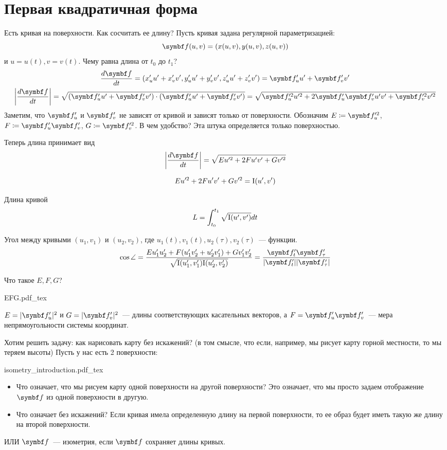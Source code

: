 \documentclass[main]{subfiles}
\begin{document}
\chapter{Первая квадратичная форма}
Есть кривая на поверхности. Как сосчитать ее длину?
Пусть кривая задана регулярной параметризацией:
\[\vf(u,v) = (x(u,v), y(u,v), z(u,v))\]
и $u = u(t), v = v(t)$.
Чему равна длина от $t_0$ до $t_1$?
\begin{gather*}
    \frac{d\vf}{dt} = (x_u' u' + x_v' v', y_u' u' + y_v' v', z_u' u' + z_v' v') = \vf_u' u' + \vf_v' v'\\
    \left| \frac{d\vf}{dt} \right| = \sqrt{(\vf_u' u' + \vf_v' v') \cdot (\vf_u' u' + \vf_v' v')} = \sqrt{\vf_u'^2 u'^2 + 2 \vf_u'\vf_v' u'v' + \vf_v'^2 v'^2}
\end{gather*}
Заметим, что $\vf_u'$ и $\vf'_v$ не зависят от кривой и зависят только от поверхности.
Обозначим $E \coloneqq \vf_u'^2$, $F \coloneqq \vf_u' \vf_v'$, $G \coloneqq \vf_v'^2$.
В чем удобство? Эта штука определяется только поверхностью.

Теперь длина принимает вид
\[\left| \frac{d\vf}{dt} \right| = \sqrt{E u'^2 + 2Fu'v' + Gv'^2}\]
\begin{definition}
    \[Eu'^2 + 2F u'v' + G v'^2 = \mathrm{I}(u',v')\]
\end{definition}
\begin{theorem}
    Длина кривой
    \[L = \int_{t_0}^{t_1} \sqrt{\mathrm{I}(u', v')} dt\]
\end{theorem}
\begin{theorem}
    Угол между кривыми $(u_1, v_1)$ и $(u_2, v_2)$, где
    $u_1(t), v_1(t), u_2(\tau), v_2(\tau)$~--- функции.
    \[\cos\angle = \frac{Eu_1' u_2' + F(u_1' v_2' + u_2' v_1') + G v_1' v_2'}{\sqrt{\fff(u_1', v_1')\fff(u_2', v_2')}} = \frac{\vf_t' \vf_\tau '}{|\vf_t'| |\vf_\tau'|}\]
\end{theorem}

Что такое $E, F, G$?
\begin{center}
    {EFG.pdf_tex}
\end{center}
$E = |\vf_u'|^2$ и $G = |\vf_v'|^2$~--- длины соответствующих касательных векторов, а
$F = \vf_u' \vf_v'$~--- мера непрямоугольности системы координат.

Хотим решить задачу: как нарисовать карту без искажений? 
(в том смысле, что если, например, мы рисует карту горной местности, то мы теряем высоты)
Пусть у нас есть 2 поверхности:
\begin{center}
    {isometry_introduction.pdf_tex}
\end{center}
\begin{itemize}
    \item Что означает, что мы рисуем карту одной поверхности на другой поверхности?
          Это означает, что мы просто задаем отображение $\vf$ из одной поверхности в другую.
    \item Что означает без искажений?
          Если кривая имела определенную длину на первой поверхности, то ее образ будет иметь такую же длину на второй поверхности.
\end{itemize}
ИЛИ $\vf$~--- изометрия, если $\vf$ сохраняет длины кривых.
\end{document}

